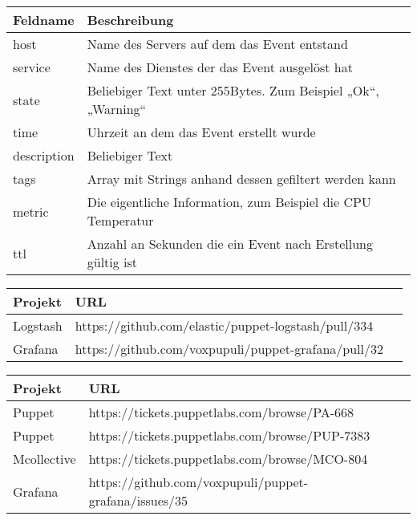 \begin{center}
  \begin{tabular}{ll}
  \toprule
  Feldname    & Beschreibung                                                 \\
  \midrule
  host        & Name des Servers auf dem das Event entstand                  \\
  service     & Name des Dienstes der das Event ausgelöst hat                \\
  state       & Beliebiger Text unter 255Bytes. Zum Beispiel „Ok“, „Warning“ \\
  time        & Uhrzeit an dem das Event erstellt wurde                      \\
  description & Beliebiger Text                                              \\
  tags        & Array mit Strings anhand dessen gefiltert werden kann        \\
  metric      & Die eigentliche Information, zum Beispiel die CPU Temperatur \\
  ttl         & Anzahl an Sekunden die ein Event nach Erstellung gültig ist  \\
  \bottomrule
\end{tabular}
\label{tbl:riemann}
\end{center}

\begin{center}
  \begin{tabular}{lll}
  \toprule
    Projekt  & URL                                                 \\
  \midrule
    Logstash & https://github.com/elastic/puppet-logstash/pull/334 \\
    Grafana  & https://github.com/voxpupuli/puppet-grafana/pull/32 \\
  \bottomrule
\end{tabular}
\label{tbl:fossprs}
\end{center}

\begin{center}
  \begin{tabular}{ll}
  \toprule
    Projekt     & URL                                                   \\
  \midrule
    Puppet      & https://tickets.puppetlabs.com/browse/PA-668          \\
    Puppet      & https://tickets.puppetlabs.com/browse/PUP-7383        \\
    Mcollective & https://tickets.puppetlabs.com/browse/MCO-804         \\
    Grafana     & https://github.com/voxpupuli/puppet-grafana/issues/35 \\
  \bottomrule
\end{tabular}
\label{tbl:fossissues}
\end{center}
